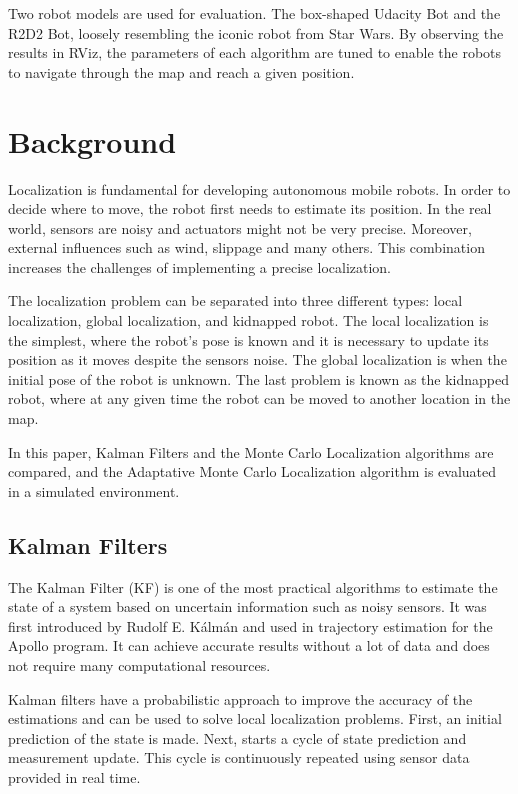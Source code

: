 \documentclass[10pt,journal,compsoc]{IEEEtran}
\begin{document}
Two robot models are used for evaluation. The box-shaped Udacity Bot and the R2D2 Bot, loosely resembling the iconic robot from Star Wars. By observing the results in RViz, the parameters of each algorithm are tuned to enable the robots to navigate through the map and reach a given position.



\section{Background}

Localization is fundamental for developing autonomous mobile robots. In order to decide where to move, the robot first needs to estimate its position. In the real world, sensors are noisy and actuators might not be very precise. Moreover, external influences such as wind, slippage and many others. This combination increases the challenges of implementing a precise localization.

The localization problem can be separated into three different types: local localization, global localization, and kidnapped robot. The local localization is the simplest, where the robot's pose is known and it is necessary to update its position as it moves despite the sensors noise. The global localization is when the initial pose of the robot is unknown. The last problem is known as the kidnapped robot, where at any given time the robot can be moved to another location in the map.

In this paper, Kalman Filters and the Monte Carlo Localization algorithms are compared, and the Adaptative Monte Carlo Localization algorithm is evaluated in a simulated environment.




\subsection{Kalman Filters}
The Kalman Filter (KF) is one of the most practical algorithms to estimate the state of a system based on uncertain information such as noisy sensors. It was first introduced by Rudolf E. Kálmán and used in trajectory estimation for the Apollo program. It can achieve accurate results without a lot of data and does not require many computational resources.

Kalman filters have a probabilistic approach to improve the accuracy of the estimations and can be used to solve local localization problems. First, an initial prediction of the state is made. Next, starts a cycle of state prediction and measurement update. This cycle is continuously repeated using sensor data provided in real time.
\end{document}
